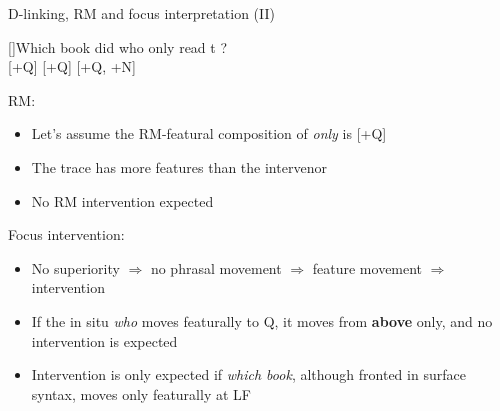 \documentclass[11pt,final,hyperref={pdfpagelabels=false}]{beamer}
\begin{document}
\begin{frame}{D-linking, RM and focus interpretation (II)}

\begin{exe}
[\footnotesize *]{\footnotesize{\gll Which book did who only read t ? \\
[+Q, +N] {}  [+Q] [+Q] {} {[+Q, +N]} \\
}}
\end{exe}

RM:
\begin{itemize}
\item Let's assume the RM-featural composition of \textit{only} is [+Q]
\item The trace has more features than the intervenor
\item No RM intervention expected
\end{itemize}

Focus intervention:
\begin{itemize}
\item No superiority $\Rightarrow$ no phrasal movement $\Rightarrow$ feature movement $\Rightarrow$ intervention
\item If the in situ \textit{who} moves featurally to Q, it moves from \textbf{above} only, and no intervention is expected
\item Intervention is only expected if \textit{which book}, although fronted in surface syntax, moves only featurally at LF
\end{itemize}

\end{frame}
\end{document}
